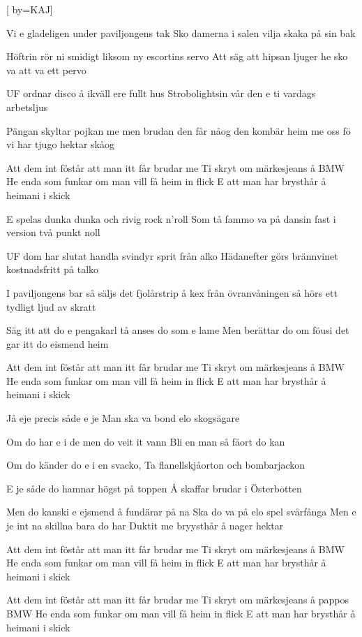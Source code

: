 

[ 		%
	by={KAJ}]						%
	

\beginverse*						%
Vi e gladeligen under paviljongens tak
Sko damerna i salen vilja skaka på sin bak

Höftrin rör ni smidigt liksom ny escortins servo
Att säg att hipsan ljuger he sko va att va ett pervo

UF ordnar disco å ikväll ere fullt hus
Strobolightsin vår den e ti vardags arbetsljus

Pängan skyltar pojkan me men brudan den får nåog
den kombär heim me oss fö vi har tjugo hektar skåog
\endverse							%

\beginchorus
Att dem int föstår att man itt får brudar me
Ti skryt om märkesjeans å BMW
He enda som funkar om man vill få heim in flick
E att man har brysthår å heimani i skick
\endchorus

\beginverse*						%
E spelas dunka dunka och rivig rock n'roll
Som tå fammo va på dansin fast i version två punkt noll

UF dom har slutat handla svindyr sprit från alko
Hädanefter görs brännvinet kostnadsfritt på talko

I paviljongens bar så säljs det fjolårstrip å kex
från övranvåningen så hörs ett tydligt ljud av skratt 

Säg itt att do e pengakarl tå anses do som e lame
Men berättar do om föusi det gar itt do eismend heim
\endverse							%

\beginchorus
Att dem int föstår att man itt får brudar me
Ti skryt om märkesjeans å BMW
He enda som funkar om man vill få heim in flick
E att man har brysthår å heimani i skick
\endchorus

\beginverse*						%
Jå eje precis såde e je
Man ska va bond elo skogsägare 

Om do har e i de men do veit it vann
Bli en man så fåort do kan

Om do känder do e i en svacko,
Ta flanellskjåorton och bombarjackon

E je såde do hamnar högst på toppen
Å skaffar brudar i Österbotten

Men do kanski e ejsmend å fundärar på na
Ska do va på elo spel svårfånga
Men e je int na skillna bara do har
Duktit me bryysthår å nager hektar
\endverse							%

\beginchorus
Att dem int föstår att man itt får brudar me
Ti skryt om märkesjeans å BMW
He enda som funkar om man vill få heim in flick
E att man har brysthår å heimani i skick
\endchorus

\beginchorus
Att dem int föstår att man itt får brudar me
Ti skryt om märkesjeans å pappos BMW
He enda som funkar om man vill få heim in flick
E att man har brysthår å heimani i skick
\endchorus


\endsong							%